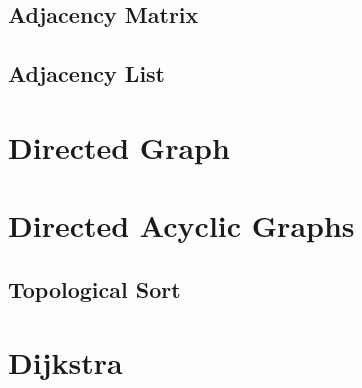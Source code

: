 \documentclass[12pt,a4paper]{article}
\begin{document}
\subsection{Adjacency Matrix}
\subsection{Adjacency List}

\section{Directed Graph}

\section{Directed Acyclic Graphs}
\subsection{Topological Sort}

\section{Dijkstra}
\end{document}
